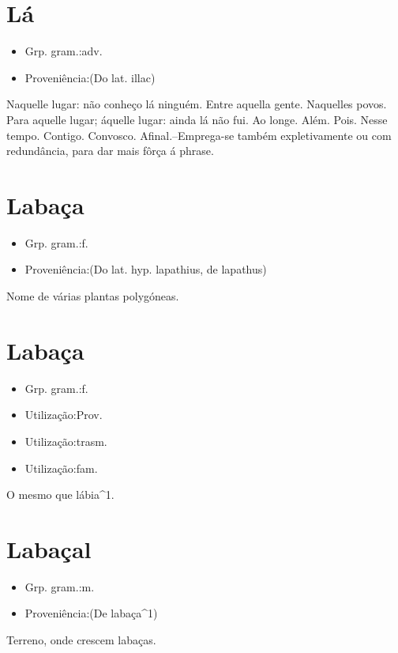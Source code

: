 \section{Lá}
\begin{itemize}
\item {Grp. gram.:adv.}
\end{itemize}
\begin{itemize}
\item {Proveniência:(Do lat. \textunderscore illac\textunderscore )}
\end{itemize}
Naquelle lugar: \textunderscore não conheço lá ninguém\textunderscore .
Entre aquella gente.
Naquelles povos.
Para aquelle lugar; áquelle lugar: \textunderscore ainda lá não fui\textunderscore .
Ao longe.
Além.
Pois.
Nesse tempo.
Contigo.
Convosco.
Afinal.--Emprega-se também expletivamente ou com redundância, para dar mais fôrça á phrase.
\section{Labaça}
\begin{itemize}
\item {Grp. gram.:f.}
\end{itemize}
\begin{itemize}
\item {Proveniência:(Do lat. hyp. \textunderscore lapathius\textunderscore , de \textunderscore lapathus\textunderscore )}
\end{itemize}
Nome de várias plantas polygóneas.
\section{Labaça}
\begin{itemize}
\item {Grp. gram.:f.}
\end{itemize}
\begin{itemize}
\item {Utilização:Prov.}
\end{itemize}
\begin{itemize}
\item {Utilização:trasm.}
\end{itemize}
\begin{itemize}
\item {Utilização:fam.}
\end{itemize}
O mesmo que \textunderscore lábia\textunderscore ^1.
\section{Labaçal}
\begin{itemize}
\item {Grp. gram.:m.}
\end{itemize}
\begin{itemize}
\item {Proveniência:(De \textunderscore labaça\textunderscore ^1)}
\end{itemize}
Terreno, onde crescem labaças.

